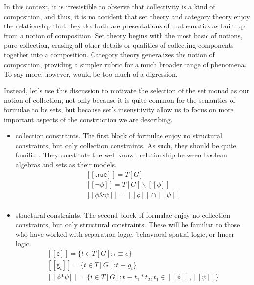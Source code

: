 \documentclass[]{acm_proc_article-sp}
\newcommand{\ldb}{[\![}
\newcommand{\rdb}{]\!]}
\newcommand{\scong}{\mathbin{\equiv}}
\newcommand{\meaningof}[1]{\ldb #1 \rdb}
\numberwithin{equation}{subsection}
\begin{document}
In this context, it is irresistible to observe that collectivity is a
kind of composition, and thus, it is no accident that set theory and
category theory enjoy the relationship that they do: both are
presentations of mathematics as built up from a notion of
composition. Set theory begins with the most basic of notions, pure
collection, erasing all other details or qualities of collecting
components together into a composition. Category theory generalizes
the notion of composition, providing a simpler rubric for a much
broader range of phenomena. To say more, however, would be too much of
a digression.

Instead, let's use this discussion to motivate the selection of the
set monad as our notion of collection, not only because it is quite
common for the semantics of formulae to be sets, but because set's
insensitivity allow us to focus on more important aspects of the
construction we are describing.

\begin{itemize}
\item collection constraints. The first block of formulae enjoy no
  structural constraints, but only collection constraints. As such,
  they should be quite familiar. They constitute the well known
  relationship between boolean algebras and sets as their models.
    \begin{equation*}
      \begin{aligned}
        \meaningof{\mathsf{true}} = T[G] \\
        \meaningof{\mathsf{\neg}\phi} = T[G] \backslash \meaningof{\phi} \\
        \meaningof{\phi \mathsf{\&} \psi} = \meaningof{\phi} \cap \meaningof{\psi} \\
      \end{aligned}
    \end{equation*}
  \item structural constraints. The second block of formulae enjoy no
    collection constraints, but only structural constraints. These
    will be familiar to those who have worked with separation logic,
    behavioral spatial logic, or linear logic.
    \begin{equation*}
      \begin{aligned}
        \meaningof{\mathsf{e}} = \{ t \in T[G] : t \scong e \} \\
        \meaningof{\mathsf{g}_i} = \{ t \in T[G] : t \scong g_i \}  \\
        \meaningof{\phi \mathsf{*} \psi} = \{ t \in T[G] : t \scong t_1 * t_2, t_1 \in \meaningof{\phi}, \meaningof{\psi} \} \\
      \end{aligned}
    \end{equation*}
\end{itemize}
\end{document}
